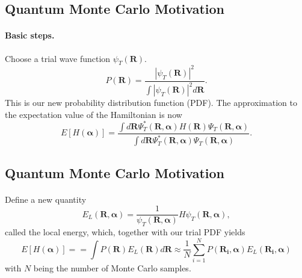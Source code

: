 \documentclass[%
twoside,                 %
final,                   %
10pt]{article}
\begin{document}
\noindent




\subsection{Quantum Monte Carlo Motivation}

\paragraph{Basic steps.}
Choose a trial wave function
$\psi_T(\bm{R})$.
\[
   P(\bm{R})= \frac{\left|\psi_T(\bm{R})\right|^2}{\int \left|\psi_T(\bm{R})\right|^2d\bm{R}}.
\]
This is our new probability distribution function  (PDF).
The approximation to the expectation value of the Hamiltonian is now 
\[
   E[H(\bm{\alpha})] = 
   \frac{\int d\bm{R}\Psi^{\ast}_T(\bm{R},\bm{\alpha})H(\bm{R})\Psi_T(\bm{R},\bm{\alpha})}
        {\int d\bm{R}\Psi^{\ast}_T(\bm{R},\bm{\alpha})\Psi_T(\bm{R},\bm{\alpha})}.
\]




\subsection{Quantum Monte Carlo Motivation}

\paragraph{}
Define a new quantity
\[
   E_L(\bm{R},\bm{\alpha})=\frac{1}{\psi_T(\bm{R},\bm{\alpha})}H\psi_T(\bm{R},\bm{\alpha}),
   \label{eq:locale1}
\]
called the local energy, which, together with our trial PDF yields
\[
  E[H(\bm{\alpha})]= = \int P(\bm{R})E_L(\bm{R}) d\bm{R}\approx \frac{1}{N}\sum_{i=1}^NP(\bm{R_i},\bm{\alpha})E_L(\bm{R_i},\bm{\alpha})
  \label{eq:vmc1}
\]
with $N$ being the number of Monte Carlo samples.






\printindex
\end{document}
